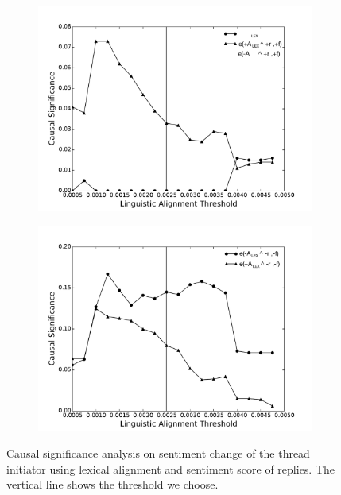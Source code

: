 \documentclass[man,biblatex,floatsintext]{apa6}
\begin{document}
\begin{figure}[!htb]
\begin{subfigure}{.5\textwidth}
  \centering
  \includegraphics[width=\linewidth]{Figures/EnlargeposF05Lex20.pdf}    
  \caption{\label{fig:posf05Lex}}
\end{subfigure}
\begin{subfigure}{.5\textwidth}
  \centering
  \includegraphics[width=\linewidth]{Figures/EnlargenegF05Lex20.pdf}    
  \caption{\label{fig:negf05Lex}}
\end{subfigure}
\caption{Causal significance analysis on sentiment change of the thread initiator using lexical alignment and sentiment score of replies. The vertical line shows the threshold we choose.}
\label{fig:Robust_Lex}
\end{figure}
\end{document}
